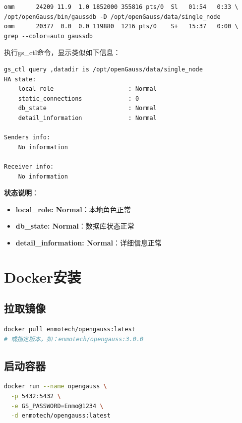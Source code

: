 \documentclass[12pt,UTF8]{ctexbook}
\begin{document}
\begin{verbatim}
omm      24209 11.9  1.0 1852000 355816 pts/0  Sl   01:54   0:33 \
/opt/openGauss/bin/gaussdb -D /opt/openGauss/data/single_node
omm      20377  0.0  0.0 119880  1216 pts/0    S+   15:37   0:00 \
grep --color=auto gaussdb
\end{verbatim}

执行gs\_ctl命令，显示类似如下信息：

\begin{verbatim}
gs_ctl query ,datadir is /opt/openGauss/data/single_node
HA state:
    local_role                     : Normal
    static_connections             : 0
    db_state                       : Normal
    detail_information             : Normal

Senders info:
    No information

Receiver info:
    No information
\end{verbatim}

\textbf{状态说明}：
\begin{itemize}[leftmargin=2cm]
    \item \textbf{local\_role: Normal}：本地角色正常
    \item \textbf{db\_state: Normal}：数据库状态正常
    \item \textbf{detail\_information: Normal}：详细信息正常
\end{itemize}

\section{Docker安装}

\subsection{拉取镜像}

\begin{lstlisting}[language=bash, caption=拉取openGauss Docker镜像]
docker pull enmotech/opengauss:latest
# 或指定版本，如：enmotech/opengauss:3.0.0
\end{lstlisting}

\subsection{启动容器}

\begin{lstlisting}[language=bash, caption=启动openGauss容器]
docker run --name opengauss \
  -p 5432:5432 \
  -e GS_PASSWORD=Enmo@1234 \
  -d enmotech/opengauss:latest
\end{lstlisting}
\end{document}
